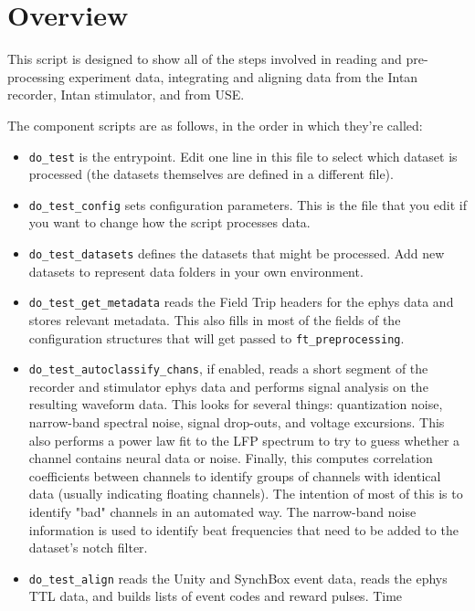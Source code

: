 
\chapter{Overview}
\label{sect-over}

This script is designed to show all of the steps involved in reading and
pre-processing experiment data, integrating and aligning data from the
Intan recorder, Intan stimulator, and from USE.

The component scripts are as follows, in the order in which they're called:

\begin{itemize}
%
\item \verb|do_test| is the entrypoint. Edit one line in this file to
select which dataset is processed (the datasets themselves are defined
in a different file).
%
\item \verb|do_test_config| sets configuration parameters. This is the file
that you edit if you want to change how the script processes data.
%
\item \verb|do_test_datasets| defines the datasets that might be processed.
Add new datasets to represent data folders in your own environment.
%
\item \verb|do_test_get_metadata| reads the Field Trip headers for the
ephys data and stores relevant metadata. This also fills in most of the
fields of the configuration structures that will get passed to
\verb|ft_preprocessing|.
%
\item \verb|do_test_autoclassify_chans|, if enabled, reads a short segment
of the recorder and stimulator ephys data and performs signal analysis on
the resulting waveform data. This looks for several things: quantization
noise, narrow-band spectral noise, signal drop-outs, and voltage excursions.
This also performs a power law fit to the LFP spectrum to try to guess
whether a channel contains neural data or noise. Finally, this computes
correlation coefficients between channels to identify groups of channels with
identical data (usually indicating floating channels). The intention of most
of this is to identify "bad" channels in an automated way. The narrow-band
noise information is used to identify beat frequencies that need to be added
to the dataset's notch filter.
%
\item \verb|do_test_align| reads the Unity and SynchBox event data, reads
the ephys TTL data, and builds lists of event codes and reward pulses. Time

\end{itemize}
